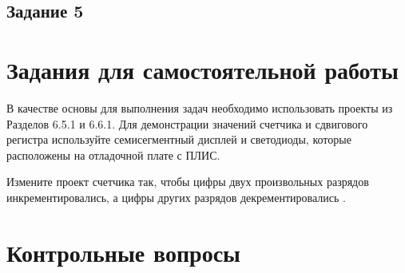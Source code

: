 \documentclass[a4paper,14pt]{article}
\begin{document}
	\subsection{Задание 5}
	
	\section{Задания для самостоятельной работы}
	
	В качестве основы для выполнения задач необходимо использовать проекты из
	Разделов 6.5.1 и 6.6.1. Для демонстрации значений счетчика и сдвигового регистра
	используйте семисегментный дисплей и светодиоды, которые расположены на отладочной
	плате с ПЛИС.
	
	Измените проект счетчика так, чтобы цифры двух произвольных разрядов
	инкрементировались, а цифры других разрядов декрементировались .
			
	\section{Контрольные вопросы}
	
\end{document}
